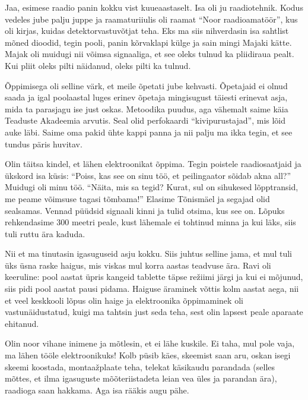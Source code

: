 
Jaa, esimese raadio panin kokku vist kuueaastaselt. Isa oli ju raadiotehnik. Kodus vedeles jube palju
juppe ja raamaturiiulis oli raamat \enquote{Noor 
raadioamatöör}, kus oli kirjas, kuidas detektorvastuvõtjat teha. Eks ma siis 
nihverdasin isa sahtlist mõned dioodid, tegin pooli, panin kõrvaklapi külge 
ja sain mingi Majaki kätte. Majak oli muidugi nii võimsa signaaliga, et see oleks tulnud ka 
pliidiraua pealt. Kui pliit oleks pilti näidanud, oleks pilti ka tulnud. 

Õppimisega oli selline värk, et meile õpetati jube kehvasti. Õpetajaid ei 
olnud saada ja igal poolaastal luges erinev õpetaja mingisugust täiesti erinevat 
asja, mida ta parasjagu ise just oskas. Metoodika puudus, aga vähemalt saime käia 
Teaduste Akadeemia arvutis. Seal olid perfokaardi 
\enquote{kivipurustajad}, mis lõid auke läbi. Saime oma pakid ühte kappi panna ja nii palju ma ikka tegin, et see tundus päris huvitav. 

Olin täitsa kindel, et lähen elektroonikat õppima. Tegin poistele 
raadiosaatjaid ja ükskord isa küsis: \enquote{Poiss, kas see on sinu töö, et
peilingaator sõidab akna all?} Muidugi oli minu töö. \enquote{Näita, mis sa 
tegid? Kurat, sul on sihukesed lõpptransid, me peame võimsuse tagasi tõmbama!} 
Elasime Tõnismäel ja segajad olid sealsamas. Vennad püüdsid signaali kinni ja tulid otsima, kus see on. 
Lõpuks rehkendasime 300 meetri peale, kust lähemale ei tohtinud minna ja 
kui läks, siis tuli ruttu ära kaduda. 

Nii et ma tinutasin igasuguseid asju kokku. Siis juhtus selline jama, et mul tuli 
üks üsna raske haigus, mis viskas mul korra aastas 
teadvuse ära. Ravi 
oli keeruline: pool aastat üpris kangeid tablette täpse 
režiimi järgi ja kui ei mõjunud, siis pidi pool aastat pausi pidama. Haiguse äraminek võttis kolm aastat aega, nii et veel keskkooli lõpus olin haige 
ja elektroonika õppimaminek oli vastunäidustatud, kuigi ma tahtsin just seda teha, sest olin lapsest peale aparaate 
ehitanud. 

Olin noor vihane inimene ja mõtlesin, et ei lähe kuskile. Ei taha, 
mul pole vaja, ma lähen tööle elektroonikuks! Kolb püsib käes, skeemist saan 
aru, oskan isegi skeemi koostada, montaažplaate teha, telekat 
käsikaudu parandada (selles mõttes, et ilma igasuguste mõõteriistadeta leian 
vea üles ja parandan ära), raadioga saan hakkama. Aga isa rääkis augu pähe. 

